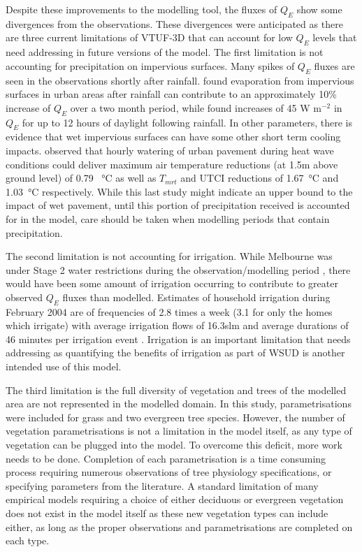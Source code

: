 \documentclass[final,3p,times,authoryear]{elsarticle}
\begin{document}
Despite these improvements to the modelling tool, the fluxes of $Q_{E}$ show some divergences from the observations. These divergences were anticipated as there are three current limitations of VTUF-3D that can account for low $Q_{E}$ levels that need addressing in future versions of the model. The first limitation is not accounting for precipitation on impervious surfaces. Many spikes of $Q_{E}$ fluxes are seen in the observations shortly after rainfall. \cite{Demuzere2014} found evaporation from impervious surfaces in urban areas after rainfall can contribute to an approximately 10\% increase of $Q_{E}$ over a two month period, while \cite{Wouters2013} found increases of 45 W m$^{-2}$ in $Q_{E}$ for up to 12 hours of daylight following rainfall. In other parameters, there is evidence that wet impervious surfaces can have some other short term cooling impacts. \cite{Hendel2016} observed that hourly watering of urban pavement during heat wave conditions could deliver maximum air temperature reductions (at 1.5m above ground level) of 0.79 \SI{}{\degreeCelsius} as well as $T_{mrt}$ and UTCI reductions of 1.67\SI{}{\degreeCelsius} and 1.03\SI{}{\degreeCelsius} respectively. While this last study might indicate an upper bound to the impact of wet pavement, until this portion of precipitation received is accounted for in the model, care should be taken when modelling periods that contain precipitation.

The second limitation is not accounting for irrigation. While Melbourne was under Stage 2 water restrictions during the observation/modelling period \citep{MelbourneWater2016a}, there would have been some amount of irrigation occurring to contribute to greater observed $Q_{E}$ fluxes than modelled. Estimates of household irrigation during February 2004 are of frequencies of 2.8 times a week (3.1 for only the homes which irrigate) with average irrigation flows of 16.3slm and average durations of 46 minutes per irrigation event \citep{Roberts2005}. Irrigation is an important limitation that needs addressing as quantifying the benefits of irrigation as part of WSUD is another intended use of this model. 

The third limitation is the full diversity of vegetation and trees of the modelled area are not represented in the modelled domain. In this study, parametrisations were included for grass and two evergreen tree species. However, the number of vegetation parametrisations is not a limitation in the model itself, as any type of vegetation can be plugged into the model. To overcome this deficit, more work needs to be done. Completion of each parametrisation is a time consuming process requiring numerous observations of tree physiology specifications, or specifying parameters from the literature. A standard limitation of many empirical models requiring a choice of either deciduous or evergreen vegetation does not exist in the model itself as these new vegetation types can include either, as long as the proper observations and parametrisations are completed on each type.
\end{document}
